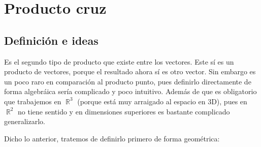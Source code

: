 \documentclass[12pt, fleqn]{report}                             %
\newcommand \Quote {\qq}                                        %
\theoremstyle{break}                                            %
\DeclareMathOperator \Reals        {\mathbb{R}}                 %
\begin{document}
        
        \clearpage
        \section{Producto cruz}
        
        	\subsection{Definición e ideas}
        
            Es el segundo tipo de producto que existe entre los vectores. Este sí es un producto \Quote{genuino} de vectores, porque el resultado ahora sí es otro vector. Sin embargo es un poco raro en comparación al producto punto, pues definirlo directamente de forma algebráica sería complicado y poco intuitivo. Además de que es obligatorio que trabajemos en $\Reals^3$ (porque está muy arraigado al espacio en 3D), pues en $\Reals^2$ no tiene sentido y en dimensiones superiores es bastante complicado generalizarlo.
            
            Dicho lo anterior, tratemos de definirlo primero de forma geométrica:
            
            
\end{document}
